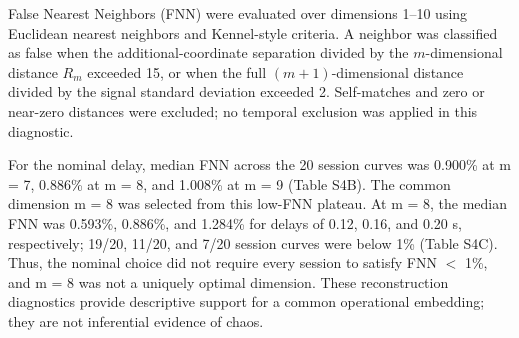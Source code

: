 False Nearest Neighbors (FNN) were evaluated over dimensions 1--10 using Euclidean nearest neighbors and Kennel-style criteria. A neighbor was classified as false when the additional-coordinate separation divided by the $m$-dimensional distance $R_m$ exceeded 15, or when the full $(m+1)$-dimensional distance divided by the signal standard deviation exceeded 2. Self-matches and zero or near-zero distances were excluded; no temporal exclusion was applied in this diagnostic.

For the nominal delay, median FNN across the 20 session curves was 0.900\% at m = 7, 0.886\% at m = 8, and 1.008\% at m = 9 (Table S4B). The common dimension m = 8 was selected from this low-FNN plateau. At m = 8, the median FNN was 0.593\%, 0.886\%, and 1.284\% for delays of 0.12, 0.16, and 0.20 s, respectively; 19/20, 11/20, and 7/20 session curves were below 1\% (Table S4C). Thus, the nominal choice did not require every session to satisfy FNN $<$ 1\%, and m = 8 was not a uniquely optimal dimension. These reconstruction diagnostics provide descriptive support for a common operational embedding; they are not inferential evidence of chaos.

